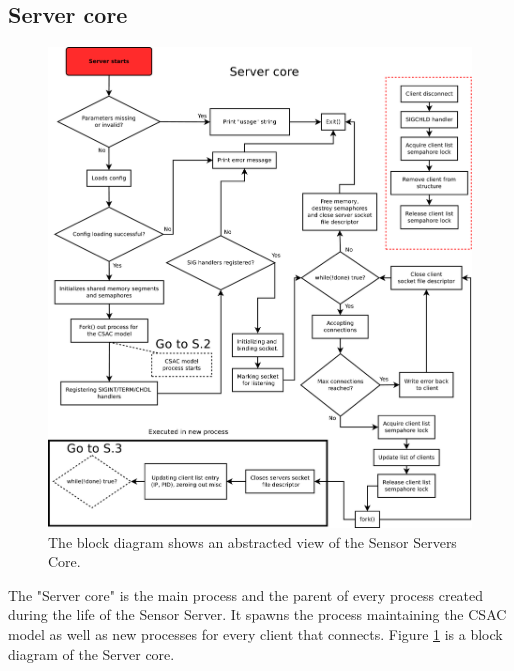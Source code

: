 \documentclass[12pt,english,a4paper]{report}
\begin{document}
\subsection{Server core}\label{server_core}
\begin{figure}
\centering
  \includegraphics[scale=0.3]{server_core.pdf}
   \caption[Socket Server Core execution flow block diagram]{The block diagram shows an abstracted view of the Sensor Servers Core.}
   \label{server_core}
\end{figure}
The "Server core" is the main process and the parent of every process created during the life of the Sensor Server. It spawns the process maintaining the CSAC model as well as new processes for every client that connects. Figure \ref{server_core} is a block diagram of the Server core. 
\end{document}
